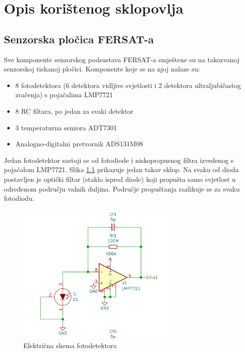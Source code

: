 \chapter{Opis korištenog sklopovlja}
    
    \section{Senzorska pločica FERSAT-a}
        Sve komponente senzorskog podsustava FERSAT-a smještene su na takozvanoj senzorskoj tiskanoj pločici. Komponente koje se na njoj nalaze su:
        \begin{itemize}
            \item 8 fotodetektora (6 detektora vidljive svjetlosti i 2 detektora ultraljubičastog zračenja) s pojačalima LMP7721
            \item 8 RC filtara, po jedan za svaki detektor
            \item 3 temperaturna senzora ADT7301
            \item Analogno-digitalni pretvornik ADS131M08
        \end{itemize}

        Jedan fotodetektor sastoji se od fotodiode i niskopropusnog filtra izvedenog s pojačalom LMP7721. Slika \ref{fig:fotosenzor} prikazuje jedan takav sklop. Na svaku od dioda postavljen je optički filtar (staklo ispred diode) koji propušta samo svjetlost u određenom području valnih duljina. Područje propuštanja razlikuje se za svaku fotodiodu.

        \begin{figure}[h]
            \centering
            \includegraphics[height=7cm]{slike/fotosenzor.png}
            \caption{Električna shema fotodetektora}
            \label{fig:fotosenzor}
        \end{figure}

